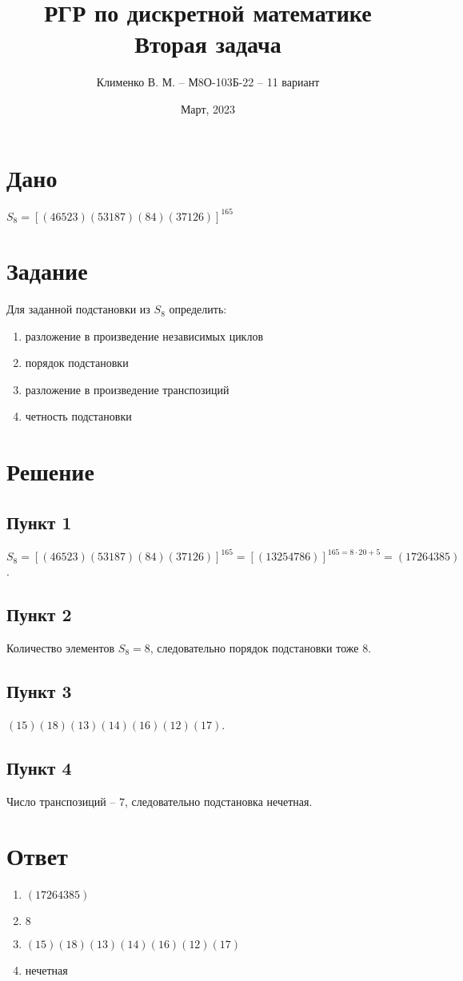 \documentclass{article}
\title{РГР по дискретной математике\\Вторая задача}
\author{Клименко В. М. -- М8О-103Б-22 -- 11 вариант}
\date{Март, 2023}
\begin{document}
\maketitle


\section*{Дано}
$S_8 = [(46523)(53187)(84)(37126)]^{165}$ 

\section*{Задание}
Для заданной подстановки из $S_8$ определить:
\begin{enumerate}
    \item разложение в произведение независимых циклов
    \item порядок подстановки
    \item разложение в произведение транспозиций
    \item четность подстановки
\end{enumerate}


\section*{Решение}
\subsection*{Пункт 1}
$S_8 = [(46523)(53187)(84)(37126)]^{165} = [(13254786)]^{165=8 \cdot 20+5}
= (17264385)$.

\subsection*{Пункт 2}
Количество элементов $S_8 = 8$, следовательно порядок подстановки тоже $8$.

\subsection*{Пункт 3}
$(15)(18)(13)(14)(16)(12)(17)$.

\subsection*{Пункт 4}
Число транспозиций -- $7$, следовательно подстановка нечетная.


\section*{Ответ}
\begin{enumerate}
    \item $(17264385)$
    \item $8$
    \item $(15)(18)(13)(14)(16)(12)(17)$
    \item нечетная
\end{enumerate}
\end{document}
